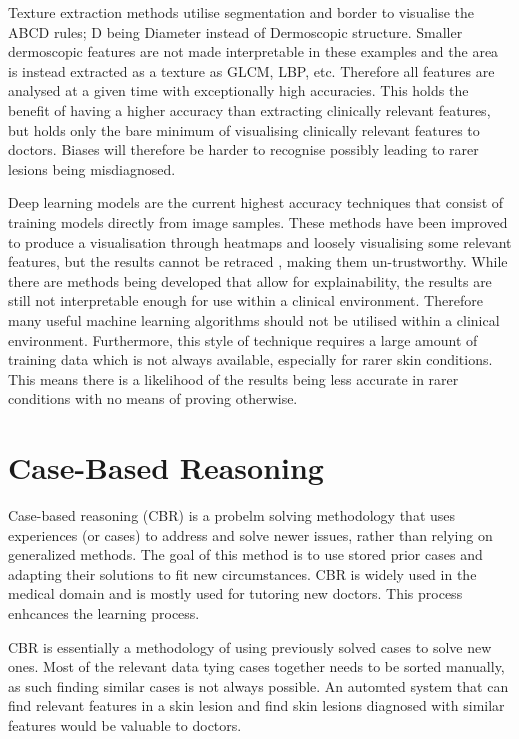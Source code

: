 Texture extraction methods utilise segmentation and border to visualise the ABCD rules; D being Diameter instead of Dermoscopic structure. Smaller dermoscopic features are not made interpretable in these examples and the area is instead extracted as a texture as GLCM, LBP, etc. Therefore all features are analysed at a given time with exceptionally high accuracies. This holds the benefit of having a higher accuracy than extracting clinically relevant features, but holds only the bare minimum of visualising clinically relevant features to doctors. Biases will therefore be harder to recognise possibly leading to rarer lesions being misdiagnosed.

Deep learning models are the current highest accuracy techniques that consist of training models directly from image samples. These methods have been improved to produce a visualisation through heatmaps and loosely visualising some relevant features, but the results cannot be retraced \cite{Kelly2019}, making them un-trustworthy. While there are methods being developed that allow for explainability, the results are still not interpretable\cite{Selvaraju2016} enough for use within a clinical environment. Therefore many useful machine learning algorithms should not be utilised within a clinical environment. Furthermore, this style of technique requires a large amount of training data which is not always available, especially for rarer skin conditions. This means there is a likelihood of the results being less accurate in rarer conditions with no means of proving otherwise.

\section{Case-Based Reasoning}
Case-based reasoning (CBR) is a probelm solving methodology that uses experiences (or cases) to address and solve newer issues, rather than relying on generalized methods. The goal of this method is to use stored prior cases and adapting their solutions to fit new circumstances. CBR is widely used in the medical domain and is mostly used for tutoring new doctors\cite{Moghadami2021}. This process enhcances the learning process.

CBR is essentially a methodology of using previously solved cases to solve new ones. Most of the relevant data tying cases together needs to be sorted manually, as such finding similar cases is not always possible. An automted system that can find relevant features in a skin lesion and find skin lesions diagnosed with similar features would be valuable to doctors.

